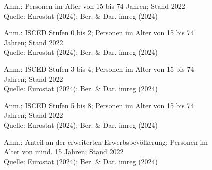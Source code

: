 \begin{figure}[p]
	{\centering {}}
	\label{map:arbeitslosenquotemaenner}
	\begin{spacing}{1} \scriptsize
		Anm.: Personen im Alter von 15 bis 74 Jahren; Stand 2022\\
		Quelle: Eurostat (2024); Ber. \& Dar. imreg (2024) \end{spacing}
\end{figure}


\begin{figure}[p]
	{\centering {}}
	\label{map:arbeitslosenquoteniedrig}
	\begin{spacing}{1} \scriptsize
		Anm.: ISCED Stufen 0 bis 2; Personen im Alter von 15 bis 74 Jahren; Stand 2022\\
		Quelle: Eurostat (2024); Ber. \& Dar. imreg (2024) \end{spacing}
\end{figure}


\begin{figure}[p]
	{\centering {}}
	\label{map:arbeitslosenquotemittel}
	\begin{spacing}{1} \scriptsize
		Anm.: ISCED Stufen 3 bis 4; Personen im Alter von 15 bis 74 Jahren; Stand 2022\\
		Quelle: Eurostat (2024); Ber. \& Dar. imreg (2024) \end{spacing}
\end{figure}


\begin{figure}[p]
	{\centering {}}
	\label{map:arbeitslosenquotehoch}
	\begin{spacing}{1} \scriptsize
		Anm.: ISCED Stufen 5 bis 8; Personen im Alter von 15 bis 74 Jahren; Stand 2022\\
		Quelle: Eurostat (2024); Ber. \& Dar. imreg (2024) \end{spacing}
\end{figure}


\begin{figure}[p]
	{\centering {}}
	\label{map:potential}
	\begin{spacing}{1} \scriptsize
		Anm.: Anteil an der erweiterten Erwerbsbevölkerung; Personen im Alter von mind. 15 Jahren; Stand 2022\\
		Quelle: Eurostat (2024); Ber. \& Dar. imreg (2024) \end{spacing}
\end{figure}


